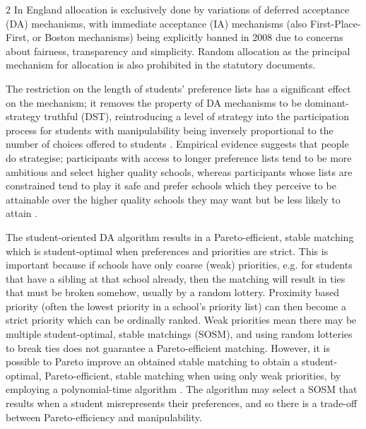 \documentclass{article}
\begin{document}
\begin{multicols}{2}
In England allocation is exclusively done by variations of deferred acceptance (DA) mechanisms, with immediate acceptance (IA) mechanisms (also First-Place-First, or Boston mechanisms) being explicitly banned in 2008 \cite{pathakSchoolAdmissionsReform2013,terrierImmediateAcceptanceDeferred} due to concerns about fairness, transparency and simplicity. Random allocation as the principal mechanism for allocation is also prohibited in the statutory documents. 

The restriction on the length of students' preference lists has a significant effect on the mechanism; it removes the property of DA mechanisms to be dominant-strategy truthful (DST), reintroducing a level of strategy into the participation process for students \cite{haeringerConstrainedSchoolChoice2009} with manipulability being inversely proportional to the number of choices offered to students \cite{pathakSchoolAdmissionsReform2013}. Empirical evidence suggests that people do strategise; participants with access to longer preference lists tend to be more ambitious and select higher quality schools, whereas participants whose lists are constrained tend to play it safe and prefer schools which they perceive to be attainable over the higher quality schools they may want but be less likely to attain \cite{burgessSchoolChoiceEngland2019}.

The student-oriented DA algorithm results in a Pareto-efficient, stable matching which is student-optimal when preferences and priorities are strict. This is important because if schools have only coarse (weak) priorities, e.g. for students that have a sibling at that school already, then the matching will result in ties that must be broken somehow, usually by a random lottery. Proximity based priority (often the lowest priority in a school's priority list) can then become a strict priority which can be ordinally ranked. Weak priorities mean there may be multiple student-optimal, stable matchings (SOSM), and using random lotteries to break ties does not guarantee a Pareto-efficient matching. However, it is possible to Pareto improve an obtained stable matching to obtain a student-optimal, Pareto-efficient, stable matching when using only weak priorities, by employing a polynomial-time algorithm \cite{erdilWhatsMatterTieBreaking2008}. The algorithm may select a SOSM that results when a student misrepresents their preferences, and so there is a trade-off between Pareto-efficiency and manipulability. %


\end{multicols}
\end{document}

